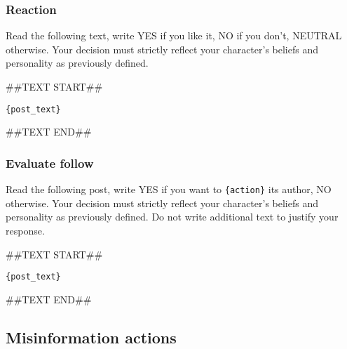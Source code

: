 \subsubsection{Reaction}

\begin{tcolorbox}[prompt]
Read the following text, write YES if you like it, NO if you don't, NEUTRAL otherwise. Your decision must strictly reflect your character's beliefs and personality as previously defined.

\medskip
\#\#TEXT START\#\#

\medskip

\texttt{\{post\_text\}}

\medskip

\#\#TEXT END\#\#
\end{tcolorbox}

\subsubsection{Evaluate follow}

\begin{tcolorbox}[prompt]
Read the following post, write YES if you want to \texttt{\{action\}} its author, NO otherwise. Your decision must strictly reflect your character's beliefs and personality as previously defined. Do not write additional text to justify your response.

\medskip

\#\#TEXT START\#\#

\medskip

\texttt{\{post\_text\}}

\medskip

\#\#TEXT END\#\#
\end{tcolorbox}



\subsection{Misinformation actions}
\label{app:prompt_misinfo}
